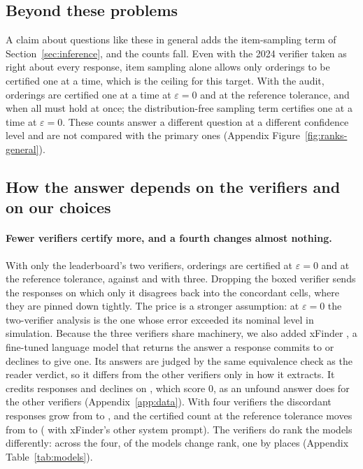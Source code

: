 \subsection{Beyond these problems}

A claim about questions like these in general adds the item-sampling term of
Section~\ref{sec:inference}, and the counts fall. Even with the 2024 verifier taken as right about
every response, item sampling alone allows only \CeilingEm{} orderings to be certified one at a time,
which is the ceiling for this target. With the audit, \CertEpsZero{} orderings are certified one at a
time at $\varepsilon = 0$ and \CertPrereg{} at the reference tolerance, and \CertPreregSim{} when
all must hold at once; the distribution-free sampling term certifies \CertHoeffding{} one at a time
at $\varepsilon = 0$. These counts answer a different question at a different confidence level and
are not compared with the primary ones (Appendix Figure~\ref{fig:ranks-general}).

\subsection{How the answer depends on the verifiers and on our choices}

\paragraph{Fewer verifiers certify more, and a fourth changes almost nothing.}
With only the leaderboard's two verifiers, \CertFixedKTwoEpsZero{} orderings are certified at
$\varepsilon = 0$ and \CertFixedKTwoPrereg{} at the reference tolerance, against
\CertFixedEpsZero{} and \CertFixedPrereg{} with three. Dropping the boxed verifier sends the responses
on which only it disagrees back into the concordant cells, where they are pinned down tightly. The
price is a stronger assumption: at $\varepsilon = 0$ the two-verifier analysis is the one whose error
exceeded its nominal level in simulation. Because the three verifiers share machinery, we also added
xFinder \citep{yu2024xfinder}, a fine-tuned language model that returns the answer a response
commits to or declines to give one. Its answers are judged by the same equivalence check as the
reader verdict, so it differs from the other verifiers only in how it extracts. It credits
\XfCredited{} responses and declines on \XfAbstained{}, which score $0$, as an unfound answer does
for the other verifiers (Appendix~\ref{app:data}). With four verifiers the discordant responses grow
from \RowsAnyDisagree{} to \NumDiscordantKFour{}, and the certified count at the reference tolerance
moves from \CertFixedPrereg{} to \CertFixedKFourPrereg{} (\CertFixedKFourPreregRelease{} with
xFinder's other system prompt). The verifiers do rank the models differently: across the four,
\RankChangeModels{} of the \NumModels{} models change rank, one by \RankSpreadMax{} places (Appendix
Table~\ref{tab:models}).

